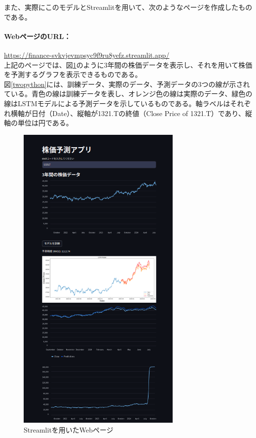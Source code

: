 \documentclass[a4paper, 11pt, titlepage]{jsarticle}
\begin{document}
\indent また、実際にこのモデルとStreamlitを用いて、次のようなページを作成したものである。\\
\paragraph{WebページのURL：}\url{https://finance-svkvjevmpsyc9f9ru8yefz.streamlit.app/} \\

\indent 上記のページでは、図\ref{Streamlit}のように3年間の株価データを表示し、それを用いて株価を予測するグラフを表示できるものである。 \\
\indent 図\ref{twopython}には、訓練データ、実際のデータ、予測データの3つの線が示されている。青色の線は訓練データを表し、オレンジ色の線は実際のデータ、緑色の線はLSTMモデルによる予測データを示しているものである。軸ラベルはそれぞれ横軸が日付（Date）、縦軸が1321.Tの終値（Close Price of 1321.T）であり、縦軸の単位は円である。

\begin{figure}[htbp]
  \centering
  \includegraphics[width=80mm]{./image/image.png}
  \caption{Streamlitを用いたWebページ}
  \label{Streamlit}
\end{figure}
\clearpage
\end{document}
